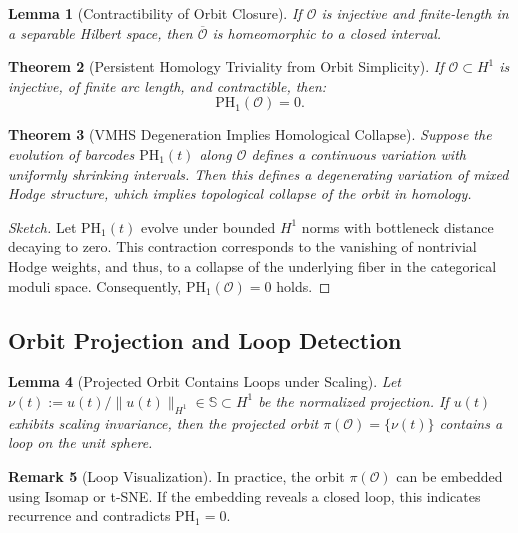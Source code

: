 \documentclass[11pt]{article}
\newtheorem{theorem}{Theorem}[section]
\newtheorem{lemma}[theorem]{Lemma}
\theoremstyle{definition}
\newtheorem{remark}[theorem]{Remark}
\begin{document}
\begin{lemma}[Contractibility of Orbit Closure]
If $\mathcal{O}$ is injective and finite-length in a separable Hilbert space, then $\overline{\mathcal{O}}$ is homeomorphic to a closed interval.
\end{lemma}

\begin{theorem}[Persistent Homology Triviality from Orbit Simplicity]
\label{thm:ph1-triviality}
If $\mathcal{O} \subset H^1$ is injective, of finite arc length, and contractible, then:
\[
\mathrm{PH}_1(\mathcal{O}) = 0.
\]
\end{theorem}

\begin{theorem}[VMHS Degeneration Implies Homological Collapse]
Suppose the evolution of barcodes $\mathrm{PH}_1(t)$ along $\mathcal{O}$ defines a continuous variation with uniformly shrinking intervals. Then this defines a degenerating variation of mixed Hodge structure, which implies topological collapse of the orbit in homology.
\end{theorem}

\begin{proof}[Sketch]
Let $\mathrm{PH}_1(t)$ evolve under bounded $H^1$ norms with bottleneck distance decaying to zero. This contraction corresponds to the vanishing of nontrivial Hodge weights, and thus, to a collapse of the underlying fiber in the categorical moduli space. Consequently, $\mathrm{PH}_1(\mathcal{O}) = 0$ holds.
\end{proof}

\subsection{Orbit Projection and Loop Detection}

\begin{lemma}[Projected Orbit Contains Loops under Scaling]
Let $\nu(t) := u(t)/\|u(t)\|_{H^1} \in \mathbb{S} \subset H^1$ be the normalized projection. If $u(t)$ exhibits scaling invariance, then the projected orbit $\pi(\mathcal{O}) = \{ \nu(t) \}$ contains a loop on the unit sphere.
\end{lemma}

\begin{remark}[Loop Visualization]
In practice, the orbit $\pi(\mathcal{O})$ can be embedded using Isomap or t-SNE. If the embedding reveals a closed loop, this indicates recurrence and contradicts $\mathrm{PH}_1 = 0$.
\end{remark}
\end{document}
